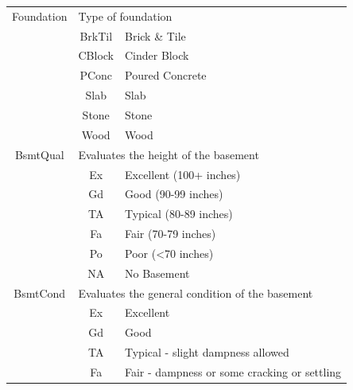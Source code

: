 \documentclass[11pt]{scrartcl} %
\begin{document}
\begin{center}
\begin{tabular}{c c c c c c}
\hline
\multicolumn{2}{|c}{Foundation} & \multicolumn{4}{l|}{Type of foundation}\\ 
\multicolumn{2}{|c}{} & \multicolumn{1}{c}{BrkTil} & \multicolumn{3}{l|}{Brick \& Tile}\\
\multicolumn{2}{|c}{} & \multicolumn{1}{c}{CBlock} & \multicolumn{3}{l|}{Cinder Block}\\
\multicolumn{2}{|c}{} & \multicolumn{1}{c}{PConc} & \multicolumn{3}{l|}{Poured Concrete}\\
\multicolumn{2}{|c}{} & \multicolumn{1}{c}{Slab} & \multicolumn{3}{l|}{Slab}\\
\multicolumn{2}{|c}{} & \multicolumn{1}{c}{Stone} & \multicolumn{3}{l|}{Stone}\\
\multicolumn{2}{|c}{} & \multicolumn{1}{c}{Wood} & \multicolumn{3}{l|}{Wood}\\
\hline
\multicolumn{2}{|c}{BsmtQual} & \multicolumn{4}{l|}{Evaluates the height of the basement}\\ 
\multicolumn{2}{|c}{} & \multicolumn{1}{c}{Ex} & \multicolumn{3}{l|}{Excellent (100+ inches)}\\
\multicolumn{2}{|c}{} & \multicolumn{1}{c}{Gd} & \multicolumn{3}{l|}{Good (90-99 inches)}\\
\multicolumn{2}{|c}{} & \multicolumn{1}{c}{TA} & \multicolumn{3}{l|}{Typical (80-89 inches)}\\
\multicolumn{2}{|c}{} & \multicolumn{1}{c}{Fa} & \multicolumn{3}{l|}{Fair (70-79 inches)}\\
\multicolumn{2}{|c}{} & \multicolumn{1}{c}{Po} & \multicolumn{3}{l|}{Poor (<70 inches)}\\
\multicolumn{2}{|c}{} & \multicolumn{1}{c}{NA} & \multicolumn{3}{l|}{No Basement}\\
\hline
\multicolumn{2}{|c}{BsmtCond} & \multicolumn{4}{l|}{Evaluates the general condition of the basement}\\ 
\multicolumn{2}{|c}{} & \multicolumn{1}{c}{Ex} & \multicolumn{3}{l|}{Excellent}\\
\multicolumn{2}{|c}{} & \multicolumn{1}{c}{Gd} & \multicolumn{3}{l|}{Good}\\
\multicolumn{2}{|c}{} & \multicolumn{1}{c}{TA} & \multicolumn{3}{l|}{Typical - slight dampness allowed}\\
\multicolumn{2}{|c}{} & \multicolumn{1}{c}{Fa} & \multicolumn{3}{l|}{Fair - dampness or some cracking or settling}\\

\end{tabular}
\end{center}
\end{document}
